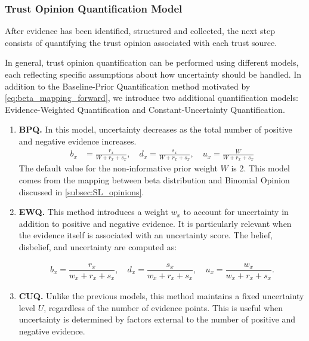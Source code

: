 \subsubsection{Trust Opinion Quantification Model}
\label{sec:trust_quant_model}
After evidence has been identified, structured and collected, the next step consists of quantifying the trust opinion associated with each trust source.

In general, trust opinion quantification can be performed using different models, each reflecting specific assumptions about how uncertainty should be handled. In addition to the Baseline-Prior Quantification method motivated by \cref{eq:beta_mapping_forward}, we introduce two additional quantification models: Evidence-Weighted Quantification and Constant-Uncertainty Quantification.

\begin{enumerate}

    \item \textbf{\ac{BPQ}.}  
    In this model, uncertainty decreases as the total number of positive and negative evidence increases.
    \begin{equation}
    \label{eq:baseline_quant_meth}
    \begin{aligned}
        b_x &= \frac{r_x}{W + r_x + s_x}, \quad
        d_x = \frac{s_x}{W + r_x + s_x}, \quad
        u_x = \frac{W}{W + r_x + s_x}
    \end{aligned}
    \end{equation}
    The default value for the non-informative prior weight \(W\) is 2. This model comes from the mapping between beta distribution and Binomial Opinion discussed in \cref{subsec:SL_opinions}.
    \item \textbf{\ac{EWQ}.}  
    This method introduces a weight $w_x$ to account for uncertainty in addition to positive and negative evidence. It is particularly relevant when the evidence itself is associated with an uncertainty score. The belief, disbelief, and uncertainty are computed as:

    \begin{equation}
    \label{eq:weight_quant_meth}
    \begin{aligned}
        b_x = \dfrac{r_x}{w_x + r_x + s_x}, \quad
        d_x = \dfrac{s_x}{w_x + r_x + s_x}, \quad
        u_x = \dfrac{w_x}{w_x + r_x + s_x}.
    \end{aligned}
    \end{equation}

    \item \textbf{\ac{CUQ}.}  
    Unlike the previous models, this method maintains a fixed uncertainty level $U$, regardless of the number of evidence points. This is useful when uncertainty is determined by factors external to the number of positive and negative evidence.


\end{enumerate}
